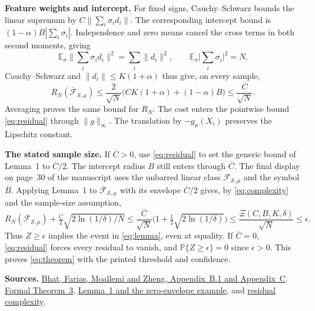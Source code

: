 \documentclass[12pt,a4paper]{article}
\newcommand{\E}{\mathbb E}
\newcommand{\Prob}{\mathbb P}
\newcommand{\Cbar}{\overline C}
\newcommand{\resclass}{\overline{\mathcal F}_{\!\mathcal S,\mu}}
\newcommand{\lead}[1]{\par\smallskip\noindent\textbf{#1}\enspace}
\begin{document}
\lead{Feature weights and intercept.}
For fixed signs, Cauchy--Schwarz bounds the linear supremum by
\(C\|\sum_i\sigma_i d_i\|\). The corresponding intercept bound is
\((1-\alpha)B|\sum_i\sigma_i|\). Independence and zero means cancel the
cross terms in both second moments, giving
\[
 \E_\sigma\Big\|\sum_i\sigma_i d_i\Big\|^2=\sum_i\|d_i\|^2,
 \qquad \E_\sigma\Big|\sum_i\sigma_i\Big|^2=N .
\]
Cauchy--Schwarz and \(\|d_i\|\le K(1+\alpha)\) thus give, on every sample,
\begin{equation}
 \widehat R_N(\resclass)
 \le \frac{2}{\sqrt N}\bigl(CK(1+\alpha)+(1-\alpha)B\bigr)
 \le \frac{\Cbar}{\sqrt N}.
 \tag{3}\label{eq:complexity}
\end{equation}
Averaging proves the same bound for \(R_N\). The cost enters the pointwise
bound \eqref{eq:residual} through \(\|g\|_\infty\). The translation by \(-g_\mu(X_i)\)
preserves the Lipschitz constant.

\lead{The stated sample size.}
If \(\Cbar>0\), use \eqref{eq:residual} to set the generic bound of Lemma~1 to
\(\Cbar/2\). The intercept radius \(B\) still enters through \(\Cbar\).
The final display on page~30 of the manuscript uses the unbarred linear
class \(\mathcal F_{\mathcal S,\mu}\) and the symbol \(\overline B\).
Applying Lemma~1 to \(\resclass\) with its envelope \(\Cbar/2\) gives,
by \eqref{eq:complexity} and the sample-size assumption,
\[
 R_N(\resclass)+\tfrac{\Cbar}{2}\sqrt{2\ln(1/\delta)/N}
 \le \frac{\Cbar}{\sqrt N}\bigl(1+\tfrac12\sqrt{2\ln(1/\delta)}\bigr)
 \le \frac{\Xi(C,B,K,\delta)}{\sqrt N}\le\epsilon .
\]
Thus \(Z\ge\epsilon\) implies the event in \eqref{eq:lemma}, even at
equality. If \(\Cbar=0\), \eqref{eq:residual} forces every residual to vanish,
and \(\Prob\{Z\ge\epsilon\}=0\) since \(\epsilon>0\).
This proves \eqref{eq:theorem} with the printed threshold and confidence.

{\small\textbf{Sources.}
\href{https://moallemi.com/ciamac/papers/kernel-adp-2012.pdf\#page=29}{Bhat, Farias, Moallemi and Zheng, Appendix~B.1 and Appendix~C}.
\href{https://github.com/nikhilpb/kadp/blob/main/lean/Theorem3.lean}{Formal Theorem~3},
\href{https://github.com/nikhilpb/kadp/blob/main/lean/OneSidedConcentration.lean}{Lemma~1 and the zero-envelope example}, and
\href{https://github.com/nikhilpb/kadp/blob/main/lean/ResidualComplexity.lean}{residual complexity}.}
\end{document}
